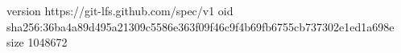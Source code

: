 version https://git-lfs.github.com/spec/v1
oid sha256:36ba4a89d495a21309c5586e363f09f46c9f4b69fb6755cb737302e1ed1a698e
size 1048672
